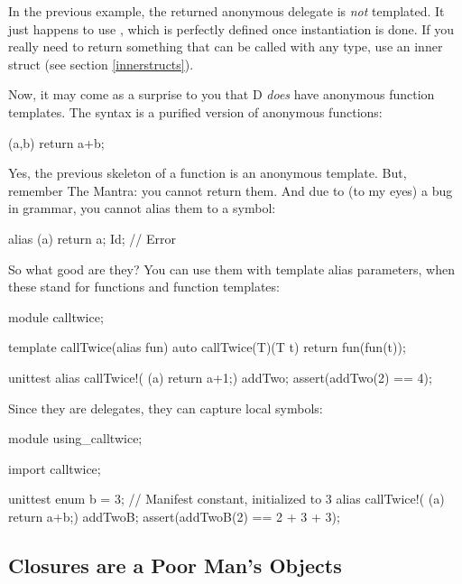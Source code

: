 In the previous example, the returned anonymous delegate is \emph{not} templated. It just happens to use , which is perfectly defined once instantiation is done. If you really need to return something that can be called with any type, use an inner struct (see section \ref{innerstructs}).

Now, it may come as a surprise to you that D \emph{does} have anonymous function templates. The syntax is a purified version of anonymous functions:

\begin{dcode}
(a,b) { return a+b;} 
\end{dcode} 

Yes, the previous skeleton of a function is an anonymous template. But, remember The Mantra: you cannot return them. And due to (to my eyes) a bug in  grammar, you cannot alias them to a symbol:

\begin{dcode}
alias (a){ return a;} Id; // Error
\end{dcode}

So what good are they? You can use them with template alias parameters, when these stand for functions and function templates:

\begin{dcode}
module calltwice;

template callTwice(alias fun)
{
    auto callTwice(T)(T t)
    {
        return fun(fun(t));
    }
}

unittest
{
    alias callTwice!( (a){ return a+1;}) addTwo;
    assert(addTwo(2) == 4);
}
\end{dcode}

Since they are delegates, they can capture local symbols:

\begin{dcode}
module using_calltwice;

import calltwice;

unittest
{
    enum b = 3; // Manifest constant, initialized to 3
    alias callTwice!( (a){ return a+b;}) addTwoB;
    assert(addTwoB(2) == 2 + 3 + 3);
}
\end{dcode}

\subsection{Closures are a Poor Man's Objects}\label{closuresareapoormansobjects}

